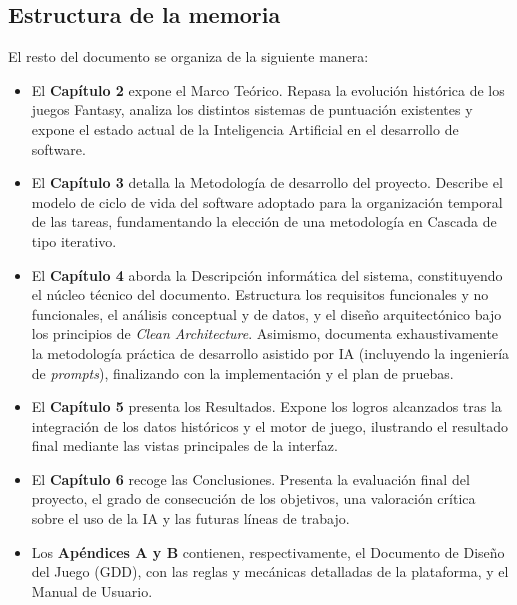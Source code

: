 \subsection{Estructura de la memoria}

El resto del documento se organiza de la siguiente manera:

\begin{itemize}
    \item El \textbf{Capítulo 2} expone el Marco Teórico. Repasa la evolución histórica de los juegos Fantasy, analiza los distintos sistemas de puntuación existentes y expone el estado actual de la Inteligencia Artificial en el desarrollo de software.
    \item El \textbf{Capítulo 3} detalla la Metodología de desarrollo del proyecto. Describe el modelo de ciclo de vida del software adoptado para la organización temporal de las tareas, fundamentando la elección de una metodología en Cascada de tipo iterativo.
    \item El \textbf{Capítulo 4} aborda la Descripción informática del sistema, constituyendo el núcleo técnico del documento. Estructura los requisitos funcionales y no funcionales, el análisis conceptual y de datos, y el diseño arquitectónico bajo los principios de \textit{Clean Architecture}. Asimismo, documenta exhaustivamente la metodología práctica de desarrollo asistido por IA (incluyendo la ingeniería de \textit{prompts}), finalizando con la implementación y el plan de pruebas.
    \item El \textbf{Capítulo 5} presenta los Resultados. Expone los logros alcanzados tras la integración de los datos históricos y el motor de juego, ilustrando el resultado final mediante las vistas principales de la interfaz.
    \item El \textbf{Capítulo 6} recoge las Conclusiones. Presenta la evaluación final del proyecto, el grado de consecución de los objetivos, una valoración crítica sobre el uso de la IA y las futuras líneas de trabajo.
    \item Los \textbf{Apéndices A y B} contienen, respectivamente, el Documento de Diseño del Juego (GDD), con las reglas y mecánicas detalladas de la plataforma, y el Manual de Usuario.
\end{itemize}


